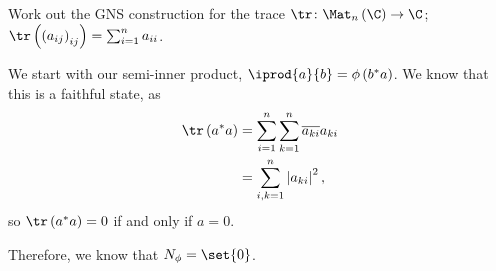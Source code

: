 \documentclass[10pt]{mypackage}
\begin{document}
\begin{exercise}
  Work out the GNS construction for the trace $\tr\colon \Mat_n\left(\C\right)\rightarrow \C$; $\tr\left(\left(a_{ij}\right)_{ij}\right) = \sum_{i=1}^{n}a_{ii}$.
\end{exercise}
\begin{solution}
  We start with our semi-inner product, $ \iprod{a}{b} = \phi\left(b^{\ast}a\right) $. We know that this is a faithful state, as
  \begin{align*}
    \tr\left(a^{\ast}a\right) &= \sum_{i=1}^{n}\sum_{k=1}^{n}\overline{a_{ki}}a_{ki}\\
                              &= \sum_{i,k=1}^{n}\left\vert a_{ki} \right\vert^2,
  \end{align*}
  so $\tr\left(a^{\ast}a\right) = 0$ if and only if $a = 0$.\newline

  Therefore, we know that $N_{\phi} = \set{0}$.
\end{solution}
\end{document}
